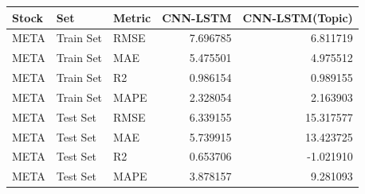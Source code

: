 \begin{tabular}{lllrr}
\toprule
Stock & Set & Metric & CNN-LSTM & CNN-LSTM(Topic) \\
\midrule
META & Train Set & RMSE & 7.696785 & 6.811719 \\
META & Train Set & MAE & 5.475501 & 4.975512 \\
META & Train Set & R2 & 0.986154 & 0.989155 \\
META & Train Set & MAPE & 2.328054 & 2.163903 \\
META & Test Set & RMSE & 6.339155 & 15.317577 \\
META & Test Set & MAE & 5.739915 & 13.423725 \\
META & Test Set & R2 & 0.653706 & -1.021910 \\
META & Test Set & MAPE & 3.878157 & 9.281093 \\
\bottomrule
\end{tabular}
